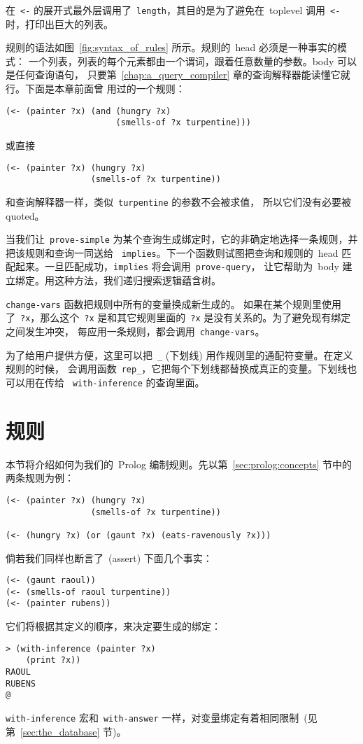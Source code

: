 在~\verb|<-| 的展开式最外层调用了~\verb|length|，其目的是为了避免在~toplevel 
调用~\verb|<-| 时，打印出巨大的列表。

规则的语法如图~\ref{fig:syntax_of_rules} 所示。规则的~head 必须是一种事实的模式：
一个列表，列表的每个元素都由一个谓词，跟着任意数量的参数。body 可以是任何查询语句，
只要第~\ref{chap:a_query_compiler} 章的查询解释器能读懂它就行。下面是本章前面曾
用过的一个规则：
\begin{lstlisting}
(<- (painter ?x) (and (hungry ?x)
                      (smells-of ?x turpentine)))
\end{lstlisting}
或直接
\begin{lstlisting}
(<- (painter ?x) (hungry ?x)
                 (smells-of ?x turpentine))
\end{lstlisting}
和查询解释器一样，类似~\verb|turpentine| 的参数不会被求值，
所以它们没有必要被 quoted。

当我们让~\verb|prove-simple| 为某个查询生成绑定时，它的非确定地选择一条规则，并把该规则和查询一同送给
~\verb|implies|。下一个函数则试图把查询和规则的~head 匹配起来。一旦匹配成功，\verb|implies| 将会调用~\verb|prove-query|，
让它帮助为~body 建立绑定。用这种方法，我们递归搜索逻辑蕴含树。

\verb|change-vars| 函数把规则中所有的变量换成新生成的。
如果在某个规则里使用了~\verb|?x|，那么这个~\verb|?x| 是和其它规则里面的~\verb|?x| 是没有关系的。为了避免现有绑定之间发生冲突，
每应用一条规则，都会调用~\verb|change-vars|。

为了给用户提供方便，这里可以把~\verb|_|
(下划线) 用作规则里的通配符变量。在定义规则的时候，
会调用函数~\verb|rep_|，它把每个下划线都替换成真正的变量。下划线也可以用在传给
~\verb|with-inference| 的查询里面。


\section{规则}
\label{sec:prolog:rules}

本节将介绍如何为我们的~Prolog 编制规则。先以第~\ref{sec:prolog:concepts} 节中的两条规则为例：
\begin{lstlisting}
(<- (painter ?x) (hungry ?x)
                 (smells-of ?x turpentine))

(<- (hungry ?x) (or (gaunt ?x) (eats-ravenously ?x)))
\end{lstlisting}
倘若我们同样也断言了~(assert) 下面几个事实：
\begin{lstlisting}
(<- (gaunt raoul))
(<- (smells-of raoul turpentine))
(<- (painter rubens))
\end{lstlisting}
它们将根据其定义的顺序，来决定要生成的绑定：
\begin{lstlisting}
> (with-inference (painter ?x)
    (print ?x))
RAOUL
RUBENS
@
\end{lstlisting}
\verb|with-inference| 宏和~\verb|with-answer| 一样，对变量绑定有着相同限制~(见第~\ref{sec:the_database} 节)。

